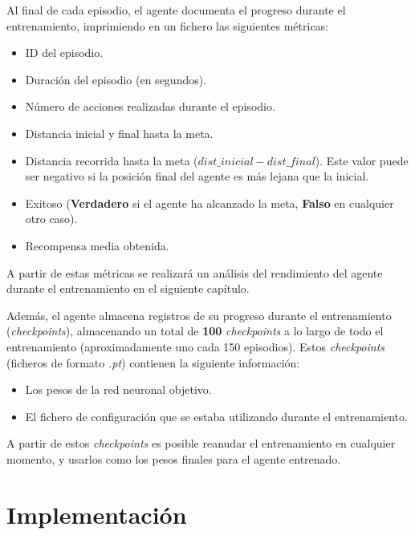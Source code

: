 Al final de cada episodio, el agente documenta el progreso durante el entrenamiento, imprimiendo en un fichero las siguientes métricas:
\begin{itemize}
	\item ID del episodio.
	\item Duración del episodio (en segundos).
	\item Número de acciones realizadas durante el episodio.
	\item Distancia inicial y final hasta la meta.
	\item Distancia recorrida hasta la meta ($dist\_inicial - dist\_final$). Este valor puede ser negativo si la posición final del agente es más lejana que la inicial.
	\item Exitoso (\textbf{Verdadero} si el agente ha alcanzado la meta, \textbf{Falso} en cualquier otro caso).
	\item Recompensa media obtenida.
\end{itemize}

A partir de estas métricas se realizará un análisis del rendimiento del agente durante el entrenamiento en el siguiente capítulo.

Además, el agente almacena registros de su progreso durante el entrenamiento (\textit{checkpoints}), almacenando un total de \textbf{100} \textit{checkpoints} a lo largo de todo el entrenamiento (aproximadamente uno cada 150 episodios). Estos \textit{checkpoints} (ficheros de formato \textit{.pt}) contienen la siguiente información:
\begin{itemize}
	\item Los pesos de la red neuronal objetivo.
	\item El fichero de configuración que se estaba utilizando durante el entrenamiento.
\end{itemize}

A partir de estos \textit{checkpoints} es posible reanudar el entrenamiento en cualquier momento, y usarlos como los pesos finales para el agente entrenado.

\section{Implementación}